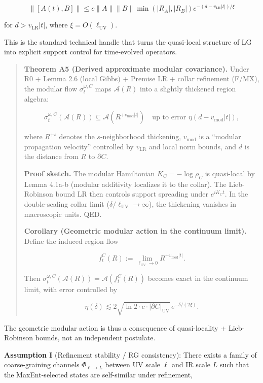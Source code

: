 \documentclass[11pt,a4paper]{article}
\theoremstyle{remark}
\begin{document}
\[
\|[A(t), B]\| \le c \|A\| \|B\| \min(|R_A|, |R_B|) e^{-(d - v_{\mathrm{LR}}|t|)/\xi}
\]

for \(d > v_{\mathrm{LR}}|t|\), where \(\xi = O(\ell_{\mathrm{UV}})\).

This is the standard technical handle that turns the quasi-local structure of
LG into explicit support control for time-evolved operators.

\begin{quote}
\textbf{Theorem A5 (Derived approximate modular covariance).} Under R0 + Lemma 2.6
(local Gibbs) + Premise LR + collar refinement (F/MX), the modular flow
\(\sigma_t^{\omega,C}\) maps \(\mathcal{A}(R)\) into a slightly thickened region
algebra:

\[
\sigma_t^{\omega,C}(\mathcal{A}(R)) \subseteq \mathcal{A}(R^{+v_{\mathrm{mod}}|t|})
\quad \text{up to error } \eta(d - v_{\mathrm{mod}}|t|),
\]

where \(R^{+s}\) denotes the \(s\)-neighborhood thickening, \(v_{\mathrm{mod}}\) is a
``modular propagation velocity'' controlled by \(v_{\mathrm{LR}}\) and local norm
bounds, and \(d\) is the distance from \(R\) to \(\partial C\).

\textbf{Proof sketch.} The modular Hamiltonian \(K_C = -\log \rho_C\) is quasi-local
by Lemma 4.1a-b (modular additivity localizes it to the collar). The
Lieb-Robinson bound LR then controls support spreading under \(e^{iK_C t}\).
In the double-scaling collar limit (\(\delta/\ell_{\mathrm{UV}} \to \infty\)),
the thickening vanishes in macroscopic units. QED.

\textbf{Corollary (Geometric modular action in the continuum limit).} Define the
induced region flow

\[
f_t^C(R) := \lim_{\ell_{\mathrm{UV}} \to 0} R^{+v_{\mathrm{mod}}|t|}.
\]

Then \(\sigma_t^{\omega,C}(\mathcal{A}(R)) = \mathcal{A}(f_t^C(R))\) becomes
exact in the continuum limit, with error controlled by

\[
\eta(\delta) \lesssim 2\sqrt{\ln 2 \cdot c \cdot |\partial C|_{\mathrm{UV}}} \, e^{-\delta/(2\xi)}.
\]
\end{quote}

The geometric modular action is thus a consequence of quasi-locality + Lieb-Robinson bounds, not an independent postulate.

\textbf{Assumption I} (Refinement stability / RG consistency): There exists a family
of coarse-graining channels \(\Phi_{\ell\to L}\) between UV scale \(\ell\) and IR
scale \(L\) such that the MaxEnt-selected states are self-similar under
refinement,
\end{document}
